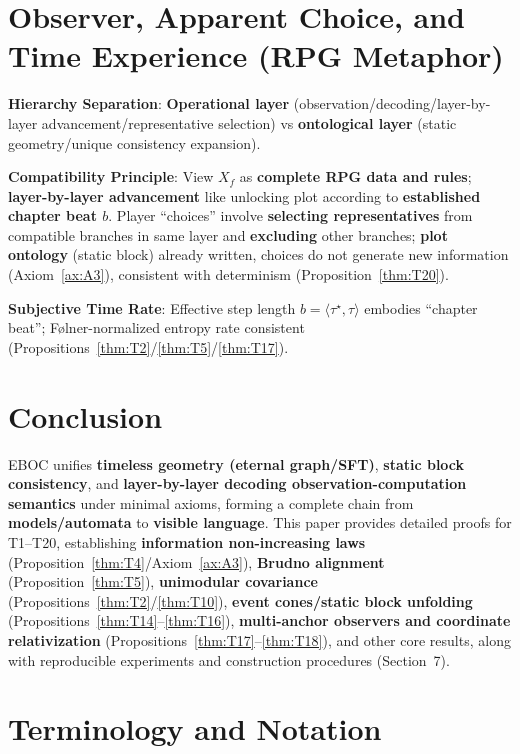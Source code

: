 \documentclass[11pt]{article}
\theoremstyle{definition}
\theoremstyle{remark}
\begin{document}
\section{Observer, Apparent Choice, and Time Experience (RPG Metaphor)}

\textbf{Hierarchy Separation}: \textbf{Operational layer} (observation/decoding/layer-by-layer advancement/representative selection) vs \textbf{ontological layer} (static geometry/unique consistency expansion).

\textbf{Compatibility Principle}: View \( X_f \) as \textbf{complete RPG data and rules}; \textbf{layer-by-layer advancement} like unlocking plot according to \textbf{established chapter beat \( b \)}. Player ``choices'' involve \textbf{selecting representatives} from compatible branches in same layer and \textbf{excluding} other branches; \textbf{plot ontology} (static block) already written, choices do not generate new information (Axiom~\ref{ax:A3}), consistent with determinism (Proposition~\ref{thm:T20}).

\textbf{Subjective Time Rate}: Effective step length \( b = \langle \tau^\star, \tau \rangle \) embodies ``chapter beat''; Følner-normalized entropy rate consistent (Propositions~\ref{thm:T2}/\ref{thm:T5}/\ref{thm:T17}).

\section{Conclusion}

EBOC unifies \textbf{timeless geometry (eternal graph/SFT)}, \textbf{static block consistency}, and \textbf{layer-by-layer decoding observation-computation semantics} under minimal axioms, forming a complete chain from \textbf{models/automata} to \textbf{visible language}. This paper provides detailed proofs for T1--T20, establishing \textbf{information non-increasing laws} (Proposition~\ref{thm:T4}/Axiom~\ref{ax:A3}), \textbf{Brudno alignment} (Proposition~\ref{thm:T5}), \textbf{unimodular covariance} (Propositions~\ref{thm:T2}/\ref{thm:T10}), \textbf{event cones/static block unfolding} (Propositions~\ref{thm:T14}--\ref{thm:T16}), \textbf{multi-anchor observers and coordinate relativization} (Propositions~\ref{thm:T17}--\ref{thm:T18}), and other core results, along with reproducible experiments and construction procedures (Section~7).

\appendix

\section{Terminology and Notation}
\end{document}
